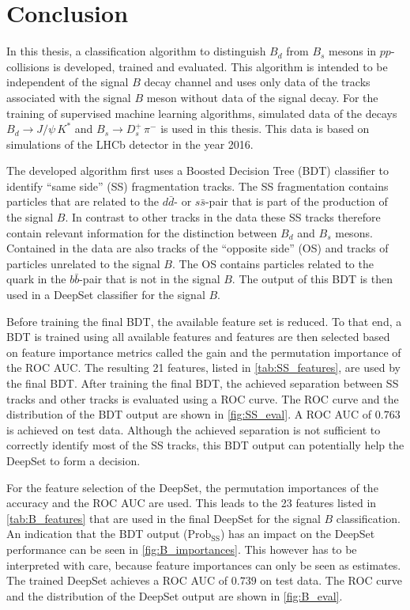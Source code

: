 \chapter{Conclusion}

In this thesis, a classification algorithm to distinguish $B_d$ from $B_s$ mesons in $pp$-collisions is developed, trained and evaluated.
This algorithm is intended to be independent of the signal $B$ decay channel and uses only data of the tracks associated with the signal $B$ meson without data of the signal decay.
For the training of supervised machine learning algorithms, simulated data of the decays $B_d \rightarrow J/\psi \, K^*$ and $B_s \rightarrow D^+_s \, \pi^-$ is used in this thesis. This data is based on simulations of the LHCb detector in the year 2016.

The developed algorithm first uses a Boosted Decision Tree (BDT) classifier to identify \enquote{same side} (SS) fragmentation tracks.
The SS fragmentation contains particles that are related to the $d\bar{d}$- or $s\bar{s}$-pair that is part of the production of the signal $B$. 
In contrast to other tracks in the data these SS tracks therefore contain relevant information for the distinction between $B_d$ and $B_s$ mesons.
Contained in the data are also tracks of the \enquote{opposite side} (OS) and tracks of particles unrelated to the signal $B$.
The OS contains particles related to the quark in the $b\bar{b}$-pair that is not in the signal $B$.
The output of this BDT is then used in a DeepSet classifier for the signal $B$.

Before training the final BDT, the available feature set is reduced.
To that end, a BDT is trained using all available features and features are then selected based on feature importance metrics called the gain and the permutation importance of the ROC AUC. The resulting 21 features, listed in \cref{tab:SS_features}, are used by the final BDT.
After training the final BDT, the achieved separation between SS tracks and other tracks is evaluated using a ROC curve.
The ROC curve and the distribution of the BDT output are shown in \cref{fig:SS_eval}. A ROC AUC of $0.763$ is achieved on test data.
Although the achieved separation is not sufficient to correctly identify most of the SS tracks, this BDT output can potentially help the DeepSet to form a decision.

For the feature selection of the DeepSet, the permutation importances of the accuracy and the ROC AUC are used.
This leads to the 23 features listed in \cref{tab:B_features} that are used in the final DeepSet for the signal $B$ classification.
An indication that the BDT output ($\text{Prob}_\text{SS}$) has an impact on the DeepSet performance can be seen in \cref{fig:B_importances}.
This however has to be interpreted with care, because feature importances can only be seen as estimates.
The trained DeepSet achieves a ROC AUC of $0.739$ on test data.
The ROC curve and the distribution of the DeepSet output are shown in \cref{fig:B_eval}.

